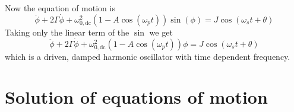 Now the equation of motion is \begin{equation}
\ddot{\phi} + 2\Gamma \dot{\phi} + \omega_{0,\textrm{dc}}^2(1 - A \cos(\omega_p t))\sin(\phi) = J\cos(\omega_s t + \theta) \end{equation}
Taking only the linear term of the $\sin$ we get \begin{equation}
\ddot{\phi} + 2\Gamma \dot{\phi} + \omega_{0,\textrm{dc}}^2(1 - A \cos(\omega_p t))\phi = J\cos(\omega_s t + \theta) \label{eq:motion} \end{equation}
which is a driven, damped harmonic oscillator with time dependent frequency.

\section{Solution of equations of motion}

